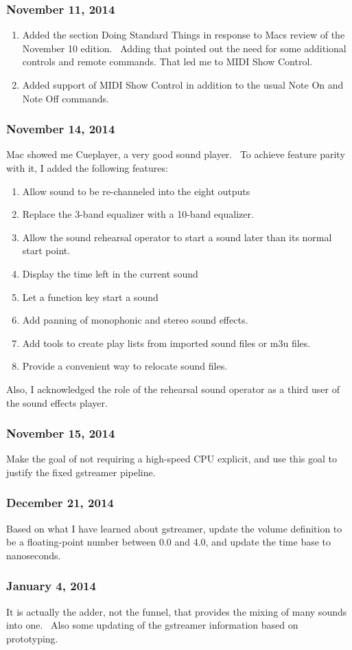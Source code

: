 \documentclass[letterpaper]{article}
\newcommand\liststyleLxxvi{%
\renewcommand\theenumi{\arabic{enumi}}
\renewcommand\theenumii{\arabic{enumii}}
\renewcommand\theenumiii{\arabic{enumiii}}
\renewcommand\theenumiv{\arabic{enumiv}}
\renewcommand\labelenumi{\theenumi.}
\renewcommand\labelenumii{\theenumii.}
\renewcommand\labelenumiii{\theenumiii.}
\renewcommand\labelenumiv{\theenumiv.}
}
\newcommand\liststyleLxxvii{%
\renewcommand\theenumi{\arabic{enumi}}
\renewcommand\theenumii{\arabic{enumii}}
\renewcommand\theenumiii{\arabic{enumiii}}
\renewcommand\theenumiv{\arabic{enumiv}}
\renewcommand\labelenumi{\theenumi.}
\renewcommand\labelenumii{\theenumii.}
\renewcommand\labelenumiii{\theenumiii.}
\renewcommand\labelenumiv{\theenumiv.}
}
\begin{document}
\subsubsection{November 11, 2014}
\liststyleLxxvi
\begin{enumerate}
\item Added the section Doing Standard Things in response to
Mac{\textquotesingle}s review of the November 10 edition. \ Adding that
pointed out the need for some additional controls and remote commands.
That led me to MIDI Show Control.
\item Added support of MIDI Show Control in addition to the usual Note
On and Note Off commands.
\end{enumerate}
\subsubsection{November 14, 2014}
Mac showed me Cueplayer, a very good sound player. \ To achieve feature
parity with it, I added the following features:

\liststyleLxxvii
\begin{enumerate}
\item Allow sound to be re-channeled into the eight outputs
\item Replace the 3-band equalizer with a 10-band equalizer.
\item Allow the sound rehearsal operator to start a sound later than its
normal start point.
\item Display the time left in the current sound
\item Let a function key start a sound
\item Add panning of monophonic and stereo sound effects.
\item Add tools to create play lists from imported sound files or m3u
files.
\item Provide a convenient way to relocate sound files.
\end{enumerate}
Also, I acknowledged the role of the rehearsal sound operator as a third
user of the sound effects player.

\subsubsection{November 15, 2014}
Make the goal of not requiring a high-speed CPU explicit, and use this
goal to justify the fixed gstreamer pipeline.

\subsubsection[December 21, 2014]{December 21, 2014}
Based on what I have learned about gstreamer, update the volume
definition to be a floating-point number between 0.0 and 4.0, and
update the time base to nanoseconds.

\subsubsection{January 4, 2014}
It is actually the adder, not the funnel, that provides the mixing of
many sounds into one. \ Also some updating of the gstreamer information
based on prototyping.


\bigskip
\end{document}
